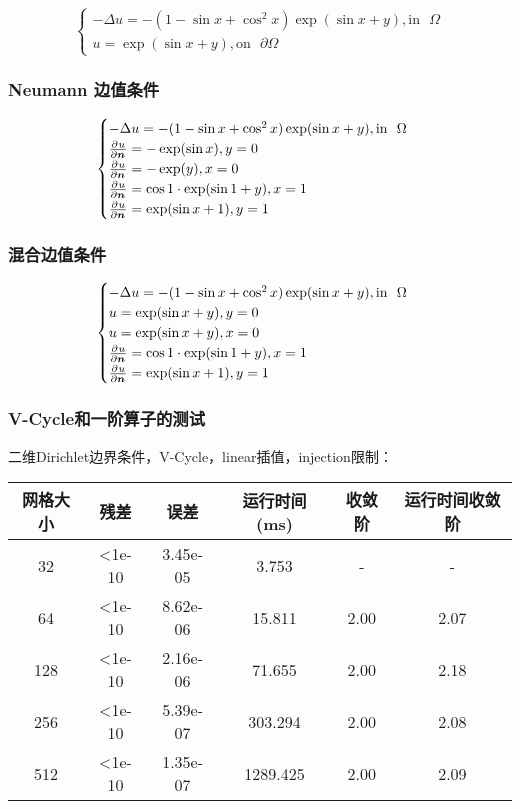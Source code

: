 \documentclass[lang=cn,a4paper,newtx,bibend=bibtex]{elegantpaper}
\begin{document}
\[
  \begin{cases}
    - \Delta u = -(1 - \sin x + \cos^2 x) \exp(\sin x + y), \text{in~~} \Omega \\
    u = \exp(\sin x + y), \text{on~~} \partial \Omega 
  \end{cases}
\]




\subsubsection{Neumann 边值条件}

\[
  \begin{cases}
    - \Delta u = -(1 - \sin x + \cos^2 x) \exp(\sin x + y), \text{in~~} \Omega \\
    \frac{\partial^{}{u}}{\partial {\bm{n}}^{}} = -\exp(\sin x), y = 0 \\
    \frac{\partial^{}{u}}{\partial {\bm{n}}^{}} = -\exp(y), x = 0 \\
    \frac{\partial^{}{u}}{\partial {\bm{n}}^{}} = \cos 1 \cdot \exp(\sin 1 + y), x = 1 \\ 
    \frac{\partial^{}{u}}{\partial {\bm{n}}^{}} = \exp(\sin x + 1), y = 1
  \end{cases}
\]



\subsubsection{混合边值条件}

\[
  \begin{cases}
    - \Delta u = -(1 - \sin x + \cos^2 x) \exp(\sin x + y), \text{in~~} \Omega \\
    u = \exp(\sin x + y), y = 0 \\
    u= \exp(\sin x + y), x = 0 \\
    \frac{\partial^{}{u}}{\partial {\bm{n}}^{}} = \cos 1 \cdot \exp(\sin 1 + y), x = 1 \\
    \frac{\partial^{}{u}}{\partial {\bm{n}}^{}} = \exp(\sin x + 1), y = 1
  \end{cases}
\]

\subsubsection{V-Cycle和一阶算子的测试}

二维Dirichlet边界条件，V-Cycle，linear插值，injection限制：

\begin{longtable}{|c|ccccc|} \hline
网格大小 & 残差 & 误差 & 运行时间(ms) & 收敛阶 & 运行时间收敛阶 \\ \hline
32 	& <1e-10	& 3.45e-05	& 3.753  & - & - \\ \hline
64 	& <1e-10	& 8.62e-06	& 15.811  & 2.00 & 2.07 \\ \hline
128	& <1e-10	& 2.16e-06	& 71.655 & 2.00 & 2.18 \\ \hline
256	& <1e-10	& 5.39e-07	& 303.294 & 2.00 & 2.08 \\ \hline
512	& <1e-10	& 1.35e-07	& 1289.425 & 2.00 & 2.09 \\ \hline
\end{longtable}
\end{document}
